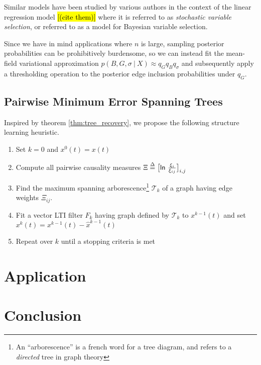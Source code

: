 \documentclass[12pt]{article}
\begin{document}
Similar models have been studied by various authors in the context of the linear regression model \hl{[(cite them)]} where it is referred to as \textit{stochastic variable selection}, or referred to as a model for Bayesian variable selection.

Since we have in mind applications where $n$ is large, sampling posterior probabilities can be prohibitively burdensome, so we can instead fit the mean-field variational approximation $p(B, G, \sigma\ |\ X) \approx q_Gq_Bq_\sigma$ and subsequently apply a thresholding operation to the posterior edge inclusion probabilities under $q_G$.

\subsection{Pairwise Minimum Error Spanning Trees}
Inspired by theorem \ref{thm:tree_recovery}, we propose the following
structure learning heuristic.


\begin{enumerate}
  \item{Set $k = 0$ and $x^0(t) = x(t)$}
  \item{Compute all pairwise causality measures $\Xi \overset{\Delta}{=} \big[\mathsf{ln\ } \frac{\xi_i}{\xi_{ij}} \big]_{i, j}$}
  \item{Find the maximum spanning arborescence\footnote{An ``arborescence'' is a french word for a tree diagram, and refers to a \textit{directed} tree in graph theory} $\mathcal{T}_k$ of a graph having edge weights $\Xi_{ij}$.}
  \item{Fit a vector LTI filter $F_k$ having graph defined by $\mathcal{T}_k$ to $x^{k - 1}(t)$ and set $x^k(t) = x^{k - 1}(t) - \hat{x}^{k - 1}(t)$}
  \item{Repeat over $k$ until a stopping criteria is met}
\end{enumerate}


\section{Application}
\section{Conclusion}

\printbibliography
\end{document}
